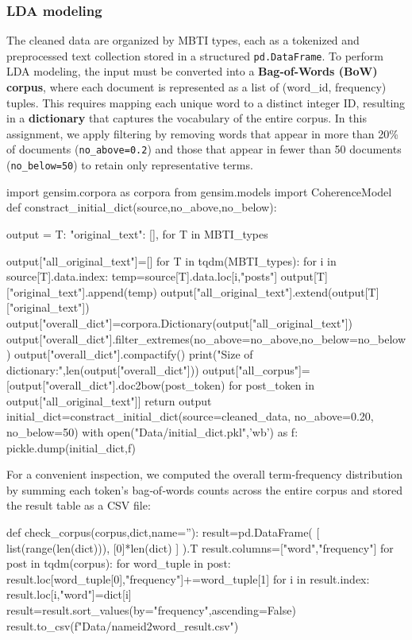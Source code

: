 \documentclass[12pt]{article}
\numberwithin{figure}{section}  %
\begin{document}
\subsubsection{LDA modeling}
	The cleaned data are organized by MBTI types, each as a tokenized and
	preprocessed text collection stored in a structured \texttt{pd.DataFrame}. 
	To perform LDA modeling, the input must be converted into a
	\textbf{Bag-of-Words (BoW) corpus}, where each document is represented as a
	list of (word\_id, frequency) tuples. This requires mapping each unique word
	to a distinct integer ID, resulting in a \textbf{dictionary} that captures
	the vocabulary of the entire corpus. In this assignment, we apply filtering
	by removing words that appear in more than 20\% of documents
	(\texttt{no\_above=0.2}) and those that appear in fewer than 50 documents
	(\texttt{no\_below=50}) to retain only representative terms.
	\begin{python}
import gensim.corpora as corpora
from gensim.models import CoherenceModel
def constract_initial_dict(source,no_above,no_below):

    output = {T: {
        "original_text": [],
    } for T in MBTI_types}
    
    output["all_original_text"]=[]
    for T in tqdm(MBTI_types):
        for i in source[T].data.index:
            temp=source[T].data.loc[i,"posts"]
            output[T]["original_text"].append(temp)
        output["all_original_text"].extend(output[T]["original_text"])
    output["overall_dict"]=corpora.Dictionary(output["all_original_text"])
    output["overall_dict"].filter_extremes(no_above=no_above,no_below=no_below)
    output["overall_dict"].compactify()
    print("Size of dictionary:",len(output["overall_dict"]))
    output["all_corpus"]=[output["overall_dict"].doc2bow(post_token) for post_token in output["all_original_text"]]
    return output
initial_dict=constract_initial_dict(source=cleaned_data,
                                    no_above=0.20,
                                    no_below=50)
with open("Data/initial_dict.pkl",'wb') as f:
    pickle.dump(initial_dict,f)
	\end{python}
	
	For a convenient inspection, we computed the overall term‐frequency
	distribution by summing each token’s bag‐of‐words counts across the entire
	corpus and stored the result table as a CSV file:
	\begin{python}
def check_corpus(corpus,dict,name=''):
    result=pd.DataFrame(
        [
            list(range(len(dict))),
            [0]*len(dict)
        ]
    ).T
    result.columns=["word","frequency"]
    for post in tqdm(corpus):
        for word_tuple in post:
            result.loc[word_tuple[0],"frequency"]+=word_tuple[1]
    for i in result.index:
        result.loc[i,"word"]=dict[i]
    result=result.sort_values(by="frequency",ascending=False)
    result.to_csv(f"Data/{name}id2word_result.csv")
	\end{python}
	
\end{document}
